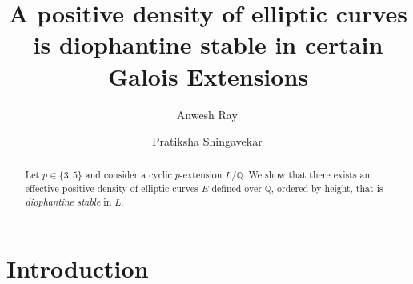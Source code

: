 \documentclass[12pt]{amsart}
\numberwithin{equation}{section}
\begin{document}
\title[Diophantine Stability in Certain Galois Extensions]{A positive density of elliptic curves is diophantine stable in certain Galois Extensions}



\author[A.~Ray]{Anwesh Ray\, }
\address[Ray]{Chennai Mathematical Institute, H1, SIPCOT IT Park, Kelambakkam, Siruseri, Tamil Nadu 603103, India}

\author[P.~Shingavekar]{Pratiksha Shingavekar\, }
\address[Shingavekar]{Chennai Mathematical Institute, H1, SIPCOT IT Park, Kelambakkam, Siruseri, Tamil Nadu 603103, India}





\begin{abstract}
Let $p \in \{3, 5\}$ and consider a cyclic $p$-extension $L/\mathbb{Q}$. We show that there exists an effective positive density of elliptic curves $E$ defined over $\mathbb{Q}$, ordered by height, that is \emph{diophantine stable} in $L$.
\end{abstract}

\maketitle

\section{Introduction}
\end{document}
